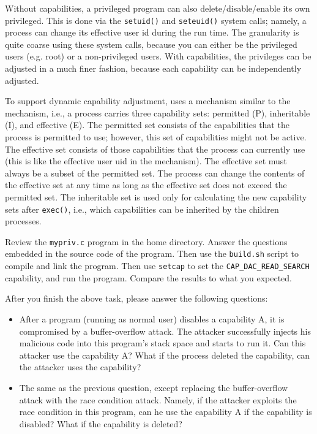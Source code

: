 Without capabilities, a privileged \setuid program can also
delete/disable/enable its own privileged. This is done via
the {\tt setuid()} and {\tt seteuid()} system calls; namely, a process
can change its effective user id during the run time. The
granularity is quite coarse using these system calls, because you can either
be the privileged users (e.g. root) or a non-privileged users.
With capabilities, the privileges can be adjusted in a much
finer fashion, because each capability can be independently adjusted.

To support dynamic capability adjustment, \linux uses a mechanism similar
to the \setuid mechanism, i.e., a process carries three capability sets:
permitted (P), inheritable (I), and  effective (E).
The permitted set consists of the capabilities that the process is permitted
to use; however, this set of capabilities might not be active.
The effective set consists of those capabilities that the process can currently
use (this is like the effective user uid in the \setuid mechanism).
The effective set must always be a subset of the permitted set.
The process can change the contents of the effective set at any time as long as the
effective set does not exceed the permitted set. The inheritable set is used
only for calculating the new capability sets after {\tt exec()}, i.e.,
which capabilities can be inherited by the children processes.

Review the \texttt{mypriv.c} program in the home directory.  Answer the
questions embedded in the source code of the program.  Then use the
\texttt{build.sh} script to compile and link the program. Then use \texttt{setcap}
to set the \texttt{CAP\_DAC\_READ\_SEARCH} capability, and run the program.
Compare the results to what you expected.

After you finish the above task, please answer the following questions:
\begin{itemize}
\item \myquestion After a program (running as normal user)  disables a capability A,
it is compromised
by a buffer-overflow attack. The attacker successfully injects his malicious
code into this program's stack space and starts to run it. Can this attacker use
the capability A? What if the process deleted the capability, can the attacker
uses the capability?

\item \myquestion The same as the previous question, except replacing the
buffer-overflow attack with the race condition attack. Namely, if
the attacker exploits the race condition in this program, can he use the
capability A if the capability is disabled? What if the capability is
deleted?


\end{itemize}


